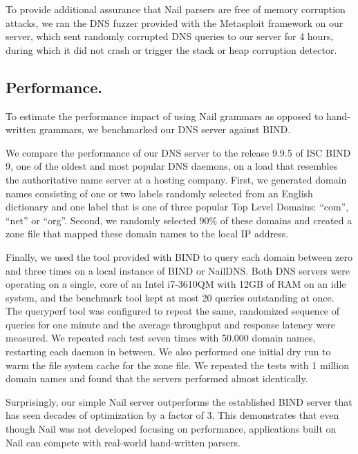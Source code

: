 To provide additional assurance that Nail parsers are free of memory corruption attacks, we ran the
DNS fuzzer provided with the Metasploit\cite{mspframework} framework on our server, which sent
randomly corrupted DNS queries to our server for 4 hours, during which it did not crash or trigger
the stack or heap corruption detector.
\subsection{Performance.}

To estimate the performance impact of using Nail grammars as opposed to hand-written grammars, we
benchmarked our DNS server against BIND.

We compare the performance of our DNS server to the release 9.9.5 of ISC BIND 9\cite{bind9}, one of
the oldest and most popular DNS daemons, on a load that resembles the authoritative name server at a
hosting company. First, we generated domain names consisting of one or
two labels randomly selected from an English dictionary and one label that is one of three popular
Top Level Domains: ``com'', ``net'' or ``org''. Second, we randomly selected 90\% of these domains and
created a zone file that mapped these domain names to the local IP address. 

Finally, we used the  tool provided with BIND to query each domain between zero
and three times on a local instance of BIND or NailDNS. Both DNS servers were operating on a single, 
core  of an Intel i7-3610QM with 12GB of RAM on an idle system, and the benchmark tool kept at most 20
queries outstanding at once. The queryperf tool was configured to
repeat the same, randomized sequence of queries for one minute and the average throughput and
response latency were measured.  We repeated each test seven times  with 50.000
domain names, restarting each daemon in between. We also performed one initial dry run to warm the
file system cache for the zone file. We repeated the tests with 1 million domain names and found
that the servers performed almost identically.

Surprisingly, our simple Nail server outperforms the established BIND server that has seen decades
of optimization by a factor of 3.  This demonstrates that even though Nail was
not developed focusing on performance, applications built on Nail can compete with real-world
hand-written parsers.



